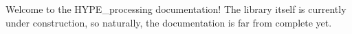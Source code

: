 Welcome to the H\-Y\-P\-E\-\_\-processing documentation! The library itself is currently under construction, so naturally, the documentation is far from complete yet. 